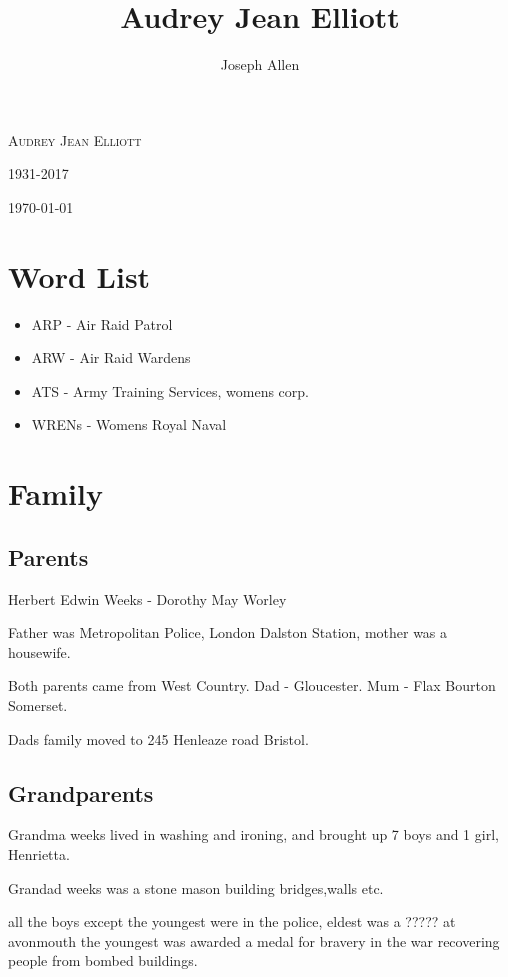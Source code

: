 \documentclass[a4paper]{report}
\title{Audrey Jean Elliott}
\author{Joseph Allen}
\begin{document}
\begin{titlepage}
	\centering
	{\scshape\LARGE Audrey Jean Elliott \par}
	\vspace{1cm}
	{\scshape\Large 1931-2017\par}
	\vfill

	{\large \today\par}
\end{titlepage}

\tableofcontents
\clearpage

\section*{Word List}
\begin{itemize}
\item ARP - Air Raid Patrol
\item ARW - Air Raid Wardens
\item ATS - Army Training Services, womens corp.
\item WRENs - Womens Royal Naval
\end{itemize}

\section*{Family}
\subsection*{Parents}
Herbert Edwin Weeks - Dorothy May Worley \newline

Father was Metropolitan Police, London Dalston Station, mother was a housewife.\newline

Both parents came from West Country. Dad - Gloucester. Mum - Flax Bourton Somerset.

Dads family moved to 245 Henleaze road Bristol.

\subsection*{Grandparents}
Grandma weeks lived in washing and ironing, and brought up 7 boys and 1 girl, Henrietta.

Grandad weeks was a stone mason building bridges,walls etc.

all the boys except the youngest were in the police, eldest was a ????? at avonmouth the youngest was awarded a medal for bravery in the war recovering people from bombed buildings.
\end{document}
